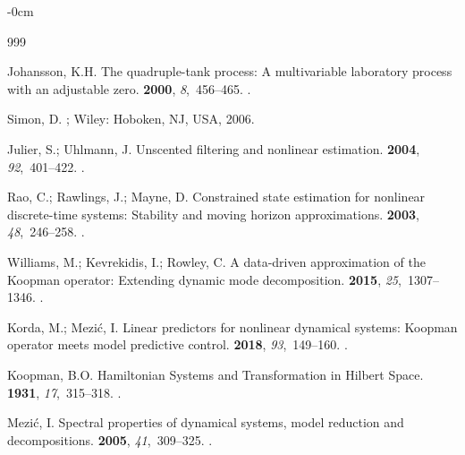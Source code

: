 \documentclass[asi,article,accept,pdftex,moreauthors]{Definitions/mdpi}
\begin{document}
\begin{adjustwidth}{-\extralength}{0cm}
\begin{thebibliography}{999}

Johansson, K.H.
\newblock The quadruple-tank process: A multivariable laboratory process with an adjustable zero.
 {\bf 2000}, {\em 8},~456--465.
.

Simon, D.
; Wiley: Hoboken, NJ, USA,  2006.


Julier, S.; Uhlmann, J.
\newblock Unscented filtering and nonlinear estimation.
 {\bf 2004}, {\em 92},~401--422.
.

Rao, C.; Rawlings, J.; Mayne, D.
\newblock Constrained state estimation for nonlinear discrete-time systems:
  Stability and moving horizon approximations.
 {\bf 2003}, {\em 48},~246--258.
.

Williams, M.; Kevrekidis, I.; Rowley, C.
\newblock A data-driven approximation of the {K}oopman operator: {E}xtending
  dynamic mode decomposition.
 {\bf 2015}, {\em 25},~1307--1346.
.

Korda, M.; Mezi\'{c}, I.
\newblock Linear predictors for nonlinear dynamical systems: {K}oopman operator meets model predictive control.
 {\bf 2018}, {\em 93},~149--160.
.

Koopman, B.O.
\newblock Hamiltonian Systems and Transformation in Hilbert Space.
 {\bf 1931},
  {\em 17},~315--318.
.

Mezi\'{c}, I.
\newblock Spectral properties of dynamical systems, model reduction and
  decompositions.
 {\bf 2005}, {\em 41},~309--325.
.


\end{thebibliography}
\end{adjustwidth}
\end{document}
